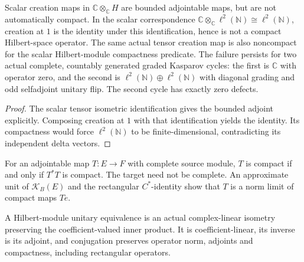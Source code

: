 \begin{proposition}\label{prop:scalar-creation-map-caution}
\leanok
Scalar creation maps in $\mathbb C\otimes_{\mathbb C}H$ are bounded
adjointable maps, but are not automatically compact. In the scalar correspondence
$\mathbb C\otimes_{\mathbb C}\ell^2(\mathbb N)\cong\ell^2(\mathbb N)$,
creation at $1$ is the identity under this identification, hence is not a
compact Hilbert-space operator. The same actual tensor creation map is
also noncompact for the scalar Hilbert-module compactness predicate.
The failure persists for two actual complete, countably generated graded
Kasparov cycles: the first is $\mathbb C$ with operator zero, and the second
is $\ell^2(\mathbb N)\oplus\ell^2(\mathbb N)$ with diagonal grading and odd
selfadjoint unitary flip. The second cycle has exactly zero defects.
\end{proposition}
\begin{proof}\leanok
The scalar tensor isometric identification gives the bounded adjoint
explicitly. Composing creation at $1$ with that identification yields the
identity. Its compactness would force $\ell^2(\mathbb N)$ to be
finite-dimensional, contradicting its independent delta vectors.
\end{proof}

\begin{proposition}\label{prop:rectangular-module-compactness}
\leanok
For an adjointable map $T:E\to F$ with complete source module,
$T$ is compact if and only if $T^*T$ is compact. The target need not be
complete. An approximate unit of $\mathcal K_B(E)$ and the rectangular
$C^*$-identity show that $T$ is a norm limit of compact maps $Te$.
\end{proposition}

\begin{definition}\label{def:hilbert-module-unitary-equivalence}
\leanok
A Hilbert-module unitary equivalence is an actual complex-linear isometry
preserving the coefficient-valued inner product. It is coefficient-linear,
its inverse is its adjoint, and conjugation preserves operator norm, adjoints
and compactness, including rectangular operators.
\end{definition}

